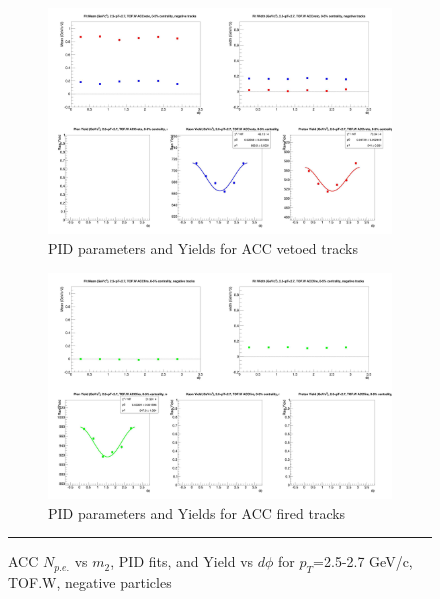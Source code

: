 \begin{figure}[H]
  \ContinuedFloat
    \begin{subfigure}{1\textwidth}
    \includegraphics[width=1\textwidth]{hiptfits/neg/fitParams_tof2_cent0_ch0_pT-25-27.jpg}
    \caption{PID parameters and Yields for ACC vetoed tracks}
    \end{subfigure}    
    \begin{subfigure}{1\textwidth}
    \includegraphics[width=1\textwidth]{hiptfits/neg/fitParams_tof3_cent0_ch0_pT-25-27.jpg}
    \caption{PID parameters and Yields for ACC fired tracks}
    \end{subfigure} 
    \rule{35em}{0.5pt}
  \caption[ACC $N_{p.e.}$ vs $m_2$, PID fits, and Yield vs $d\phi$ for $p_T$=2.5-2.7 GeV/c, TOF.W, negative particles]{ACC $N_{p.e.}$ vs $m_2$, PID fits, and Yield vs $d\phi$ for $p_T$=2.5-2.7 GeV/c, TOF.W, negative particles}
  \label{fig:acc25-27neg}
\end{figure}

